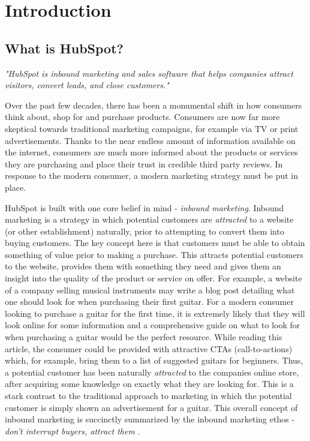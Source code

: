 \chapter{Introduction}

\section{What is HubSpot?}
\textit{"HubSpot is inbound marketing and sales software that helps companies attract visitors, convert leads, and close customers."} \cite{whatIsHubSpot}\hfill\break

Over the past few decades, there has been a monumental shift in how consumers think about, shop for and purchase products. Consumers are now far more skeptical towards traditional marketing campaigns, for example via TV or print advertisements. Thanks to the near endless amount of information available on the internet, consumers are much more informed about the products or services they are purchasing and place their trust in credible third party reviews. In response to the modern consumer, a modern marketing strategy must be put in place. 

HubSpot is built with one core belief in mind - \textit{inbound marketing}. Inbound marketing is a strategy in which potential customers are \textit{attracted} to a website (or other establishment) naturally, prior to attempting to convert them into buying customers. The key concept here is that customers must be able to obtain something of value prior to making a purchase. This attracts potential customers to the website, provides them with something they need and gives them an insight into the quality of the product or service on offer. For example, a website of a company selling musical instruments may write a blog post detailing what one should look for when purchasing their first guitar. For a modern consumer looking to purchase a guitar for the first time, it is extremely likely that they will look online for some information and a comprehensive guide on what to look for when purchasing a guitar would be the perfect resource. While reading this article, the consumer could be provided with attractive CTAs (call-to-actions) which, for example, bring them to a list of suggested guitars for beginners. Thus, a potential customer has been naturally \textit{attracted} to the companies online store, after acquiring some knowledge on exactly what they are looking for. This is a stark contrast to the traditional approach to marketing in which the potential customer is simply shown an advertisement for a guitar. This overall concept of inbound marketing is succinctly summarized by the inbound marketing ethos - \textit{don't interrupt buyers, attract them} \cite{whatIsHubSpot}.

